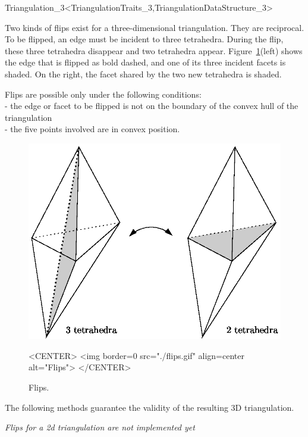 \begin{ccRefClass}{Triangulation_3<TriangulationTraits_3,TriangulationDataStructure_3>}

Two kinds of flips exist for a three-dimensional triangulation. They
are reciprocal. To be flipped, an edge must be incident to three
tetrahedra. During the flip, these three tetrahedra disappear and two
tetrahedra appear. Figure~\ref{Triangulation3-fig-flips}(left) shows the
edge that is flipped as bold dashed, and one of its three incident
facets is shaded. On the right, the facet shared by the two new
tetrahedra is shaded. 

Flips are possible only under the following conditions:\\
- the edge or facet to be flipped is not on the boundary of the convex
hull of the triangulation \\
- the five points involved are in convex position.

\begin{figure}
\begin{ccTexOnly}
\begin{center} 
\includegraphics{flips.eps}
\end{center}
\end{ccTexOnly}
\caption{Flips.
\label{Triangulation3-fig-flips}}
\begin{ccHtmlOnly}
<CENTER>
<img border=0 src="./flips.gif" align=center
alt="Flips">
</CENTER>
\end{ccHtmlOnly}
\end{figure} 

The following methods guarantee the validity of the resulting 3D
triangulation.

\textit{Flips for a 2d triangulation are not implemented yet}


\end{ccRefClass}
